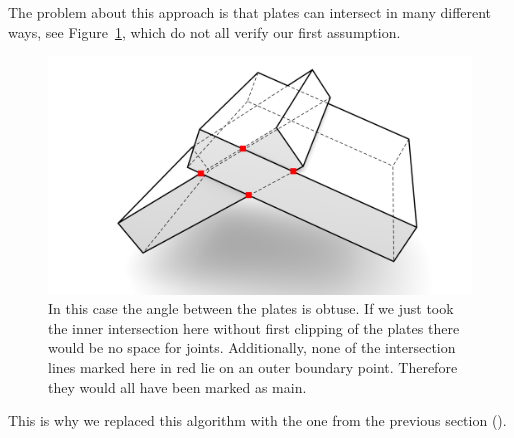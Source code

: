 \documentclass[../ClassicThesis.tex]{subfiles}
\begin{document}
The problem about this approach is that plates can intersect in many different ways, see Figure~\ref{fig:obtuseAssumption}, which do not all verify our first assumption. 
\begin{figure}[!ht]
\centering
\includegraphics[width=\columnwidth]{Images/Blocks_obtuse_overintersect.png}
\caption[Obtuse angle intersection]{In this case the angle between the plates is obtuse. If we just took the inner intersection here without first clipping of the plates there would be no space for joints. Additionally, none of the intersection lines marked here in red lie on an outer boundary point. Therefore they would all have been marked as main. }
\label{fig:obtuseAssumption}
\end{figure}
This is why we replaced this algorithm with the one from the previous section ().
\end{document}
